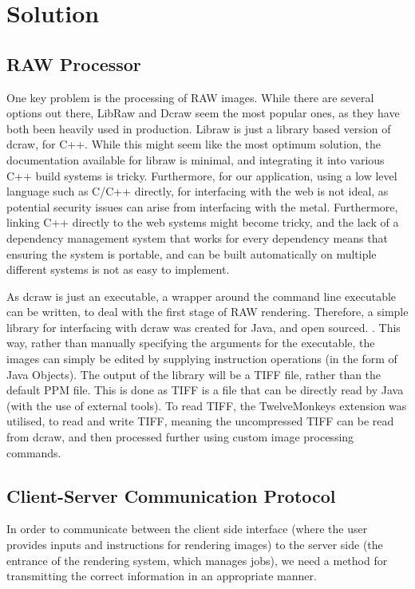 \documentclass[11pt,a4paper]{article}
\begin{document}
\section{Solution}


\subsection{RAW Processor}
One key problem is the processing of RAW images. While there are several options out there, LibRaw and Dcraw seem the most popular ones, 
as they have both been heavily used in production. Libraw is just a library based version of dcraw, for C++. While this might seem like the most optimum
solution, the documentation available for libraw is minimal, and integrating it into various C++ build systems is tricky. Furthermore, for our application,
using a low level language such as C/C++ directly, for interfacing with the web is not ideal, as potential security issues can arise from interfacing with the
metal. Furthermore, linking C++ directly to the web systems might become tricky, and the lack of a dependency management system that works for every dependency
means that ensuring the system is portable, and can be built automatically on multiple different systems is not as easy to implement.

As dcraw is just an executable, a wrapper around the command line executable can be written, to deal with the first stage of RAW rendering.
Therefore, a simple library for interfacing with dcraw was created for Java, and open sourced. \cite{JDCRAW}. This way, rather than manually
specifying the arguments for the executable, the images can simply be edited by supplying instruction operations (in the form of Java Objects).
The output of the library will be a TIFF file, rather than the default PPM file. This is done as TIFF is a file that can be directly read by
Java (with the use of external tools). To read TIFF, the TwelveMonkeys extension \cite{TwelveMonkeys} was utilised, to read and write TIFF, meaning
the uncompressed TIFF can be read from dcraw, and then processed further using custom image processing commands. 
\subsection{Client-Server Communication Protocol}
In order to communicate between the client side interface (where the user provides inputs and instructions
for rendering images) to the server side (the entrance of the rendering system, which manages jobs), we need
a method for transmitting the correct information in an appropriate manner.
\end{document}

